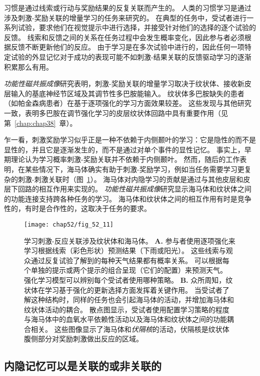 习惯是通过线索或行动与奖励结果的反复关联而产生的。
人类的习惯学习是通过涉及刺激-奖励关联的增量学习的任务来研究的。
在典型的任务中，受试者进行一系列试验，要求他们在视觉提示中进行选择，并接受针对他们的选择的逐个试验的反馈。
线索和反馈之间的关系在任务过程中会发生概率变化，因此参与者必须根据反馈不断更新他们的反应。
由于学习是在多次试验中进行的，因此任何一项特定试验的外显记忆对于成功的表现可能不如刺激-结果关联的反馈驱动学习的逐渐积累那么有用。


\textit{功能性磁共振成像}研究表明，刺激-奖励关联的增量学习取决于纹状体、接收新皮层输入的基底神经节区域及其调节性多巴胺能输入。
纹状体多巴胺缺失的患者（如帕金森病患者）在基于逐项强化的学习方面效果较差。
这些发现与其他研究一致，表明多巴胺在调节强化学习的皮层纹状体回路中具有重要作用（见第~\ref{chap:chap38}~章）。


乍一看，刺激奖励学习似乎正是一种不依赖于内侧颞叶的学习：它是隐性的而不是显性的，并且它是逐渐发生的，而不是通过对单个事件的显性记忆。
事实上，早期理论认为学习概率刺激-奖励关联并不依赖于内侧颞叶。
然而，随后的工作表明，在某些情况下，海马体确实有助于刺激-奖励学习，例如当任务需要学习更复杂的刺激-刺激关联时（图~\ref{fig:52_11}）。
海马体对内隐学习的贡献是通过与其他皮层和皮层下回路的相互作用来实现的。
\textit{功能性磁共振成像}研究显示海马体和纹状体之间的功能连接支持跨各种任务的学习。
海马体和纹状体之间的相互作用有时是竞争性的，有时是合作性的，这取决于任务的要求。


\begin{figure}[htbp]
	\centering
	\texttt{[image: chap52/fig\_52\_11]}
	\caption{学习刺激-反应关联涉及纹状体和海马体\cite{duncan2018more}。
		\textbf{A.} 参与者使用逐项强化来学习根据线索（彩色形状）预测结果（下雨或阳光）。
		这些线索与观众通过反复试验了解到的每种天气结果都有概率关系。
		可以根据每个单独的提示或两个提示的组合呈现（它们的配置）来预测天气。
		强化学习模型可以辨别每个受试者使用哪种策略。
		\textbf{B.} 众所周知，纹状体在学习基于强化的更新选择方面发挥着关键作用。
		当受试者了解这种结构时，同样的任务也会引起海马体的活动，并增加海马体和纹状体活动的耦合。
		散点图显示，受试者使用配置学习策略的程度与海马体中的血氧水平依赖性活动以及海马体和纹状体之间的功能耦合相关。
		这些图像显示了海马体和\textit{伏隔核}的活动，伏隔核是纹状体腹侧部分对奖励刺激做出反应的区域。}
	\label{fig:52_11}
\end{figure}



\subsection{内隐记忆可以是关联的或非关联的}

